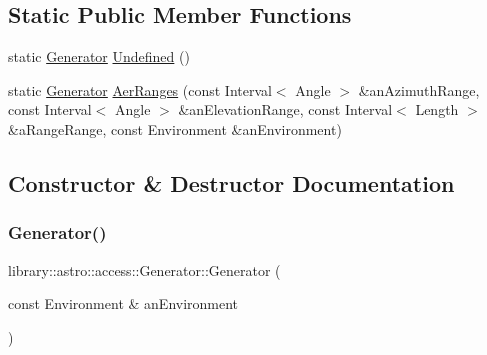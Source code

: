 \subsection*{Static Public Member Functions}
\begin{DoxyCompactItemize}
\item 
static \hyperlink{classlibrary_1_1astro_1_1access_1_1_generator}{Generator} \hyperlink{classlibrary_1_1astro_1_1access_1_1_generator_a772aae06882c9c24c93978ec246bcc83}{Undefined} ()
\item 
static \hyperlink{classlibrary_1_1astro_1_1access_1_1_generator}{Generator} \hyperlink{classlibrary_1_1astro_1_1access_1_1_generator_a51e8191b002ee609db6ce11927281bba}{Aer\+Ranges} (const Interval$<$ Angle $>$ \&an\+Azimuth\+Range, const Interval$<$ Angle $>$ \&an\+Elevation\+Range, const Interval$<$ Length $>$ \&a\+Range\+Range, const Environment \&an\+Environment)
\end{DoxyCompactItemize}


\subsection{Constructor \& Destructor Documentation}
\mbox{\label{classlibrary_1_1astro_1_1access_1_1_generator_a7b07719b1622bb4ffb7fe0d654f91fea}} 
\subsubsection{\texorpdfstring{Generator()}{Generator()}\hspace{0.1cm}{\footnotesize\ttfamily [1/2]}}
{\footnotesize\ttfamily library\+::astro\+::access\+::\+Generator\+::\+Generator (\begin{DoxyParamCaption}\item[{const Environment \&}]{an\+Environment }\end{DoxyParamCaption})}

\mbox{\label{classlibrary_1_1astro_1_1access_1_1_generator_af97f7c62f7853dfda210de3012783dd1}} 
